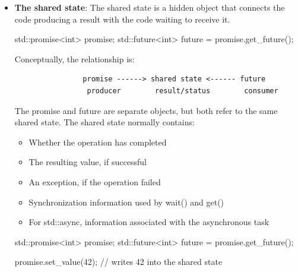 \documentclass{report}
\begin{document}
\begin{itemize}
\begin{cppcode}
{                    do_other_work();
                } // may wait here if task has not finished
            \end{cppcode}
            \bigbreak \noindent 
            Calling get() or wait() earlier makes the synchronization point explicit and easier to reason about.
        \item \textbf{The shared state}: The shared state is a hidden object that connects the code producing a result with the code waiting to receive it.
            \bigbreak \noindent 
            \begin{cppcode}
                std::promise<int> promise;
                std::future<int> future = promise.get_future();
            \end{cppcode}
            \bigbreak \noindent 
            Conceptually, the relationship is:
            \begin{verbatim}
                promise ------> shared state <------ future
                 producer        result/status        consumer
            \end{verbatim}
            \bigbreak \noindent 
            The promise and future are separate objects, but both refer to the same shared state.
            \bigbreak \noindent 
            The shared state normally contains:
            \begin{itemize}
                \item Whether the operation has completed
                \item The resulting value, if successful
                \item An exception, if the operation failed
                \item Synchronization information used by wait() and get()
                \item For std::async, information associated with the asynchronous task
            \end{itemize}
            \bigbreak \noindent 
            \begin{cppcode}
                std::promise<int> promise;
                std::future<int> future = promise.get_future();

                promise.set_value(42);  // writes 42 into the shared state


\end{cppcode}
\end{itemize}
\end{document}

